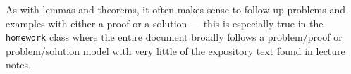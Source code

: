 \documentclass{notes}
\begin{document}
	As with lemmas and theorems, it often makes sense to follow up problems and examples with either a proof or a solution --- this is especially true in the \texttt{homework} class where the entire document broadly follows a problem/proof or problem/solution model with very little of the expository text found in lecture notes.
\end{document}

